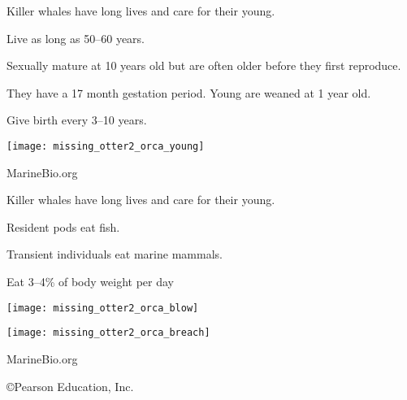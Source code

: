 \documentclass[t]{beamer}
\begin{document}
%
\begin{frame}[t]{Killer whales have long lives and care for their young.}

	\begin{multicols}{2}
	
	\hangpara Live as long as 50–60 years.

	\hangpara Sexually mature at 10 years old but are often older before they first reproduce.

	\hangpara They have  a 17 month gestation period. Young are weaned at 1 year old.

	\hangpara Give birth every 3–10 years.


	\columnbreak
	
		\texttt{[image: missing\_otter2\_orca\_young]}

	\end{multicols}
	
	\vfilll
	
	\hfill \tiny MarineBio.org

\end{frame}
%
\begin{frame}[t]{Killer whales have long lives and care for their young.}

	\begin{multicols}{2}
	
	\hangpara Resident pods eat fish. 

	\hangpara Transient individuals eat marine mammals.

	\hangpara Eat 3–4\% of body weight per day
	
	\columnbreak
	
		\texttt{[image: missing\_otter2\_orca\_blow]}
		
		\texttt{[image: missing\_otter2\_orca\_breach]}

	\end{multicols}
	
	\vspace*{-0.5\baselineskip}
	
	\hfill \tiny MarineBio.org

\end{frame}
%
%
{
\begin{frame}[b]
	\hfill \tiny \copyright Pearson Education, Inc.
\end{frame}
}
\end{document}
